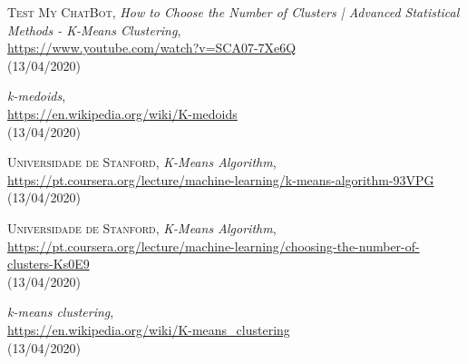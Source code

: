\documentclass[12pt, a4paper, oneside]{scrreport}
\begin{document}
\begin{thebibliography}{9}
\textsc{Test My ChatBot},
{\em How to Choose the Number of Clusters | Advanced Statistical Methods - K-Means Clustering},
\\\url{https://www.youtube.com/watch?v=SCA07-7Xe6Q}
\\(13/04/2020)



{\em k-medoids},
\\\url{https://en.wikipedia.org/wiki/K-medoids}
\\(13/04/2020)

\textsc{Universidade de Stanford},
{\em K-Means Algorithm},
\\\url{https://pt.coursera.org/lecture/machine-learning/k-means-algorithm-93VPG}
\\(13/04/2020)


\textsc{Universidade de Stanford},
{\em K-Means Algorithm},
\\\url{https://pt.coursera.org/lecture/machine-learning/choosing-the-number-of-clusters-Ks0E9}
\\(13/04/2020)

{\em k-means clustering},
\\\url{https://en.wikipedia.org/wiki/K-means_clustering}
\\(13/04/2020)

\end{thebibliography}
\end{document}
